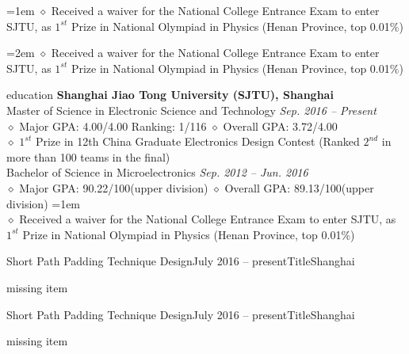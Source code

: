 \documentclass{resume} %
\begin{document}
\hangindent=1em
$\diamond$ Received a waiver for the National College Entrance Exam to enter SJTU, as $1^{st}$ Prize in National Olympiad in Physics (Henan Province, top 0.01$\%$) 
\par
\hangindent=2em
$\diamond$ Received a waiver for the National College Entrance Exam to enter SJTU, as $1^{st}$ Prize in National Olympiad in Physics (Henan Province, top 0.01$\%$)

\begin{rSection}{education}
\textbf{Shanghai Jiao Tong University (SJTU), Shanghai}
\\Master of Science in Electronic Science and Technology \hfill \emph{Sep. 2016 -- Present}
\\$\diamond$ Major GPA: 4.00/4.00 \qquad Ranking: 1/116 \qquad $\diamond$ Overall GPA: 3.72/4.00
\\$\diamond$ $1^{st}$ Prize in 12th China Graduate Electronics Design Contest (Ranked $2^{nd}$ in more than 100 teams in the final)
\\Bachelor of Science in Microelectronics \hfill \emph{Sep. 2012 -- Jun. 2016}
\\$\diamond$ Major GPA: 90.22/100(upper division) \qquad \qquad$\diamond$ Overall GPA: 89.13/100(upper division)
\hangindent=1em
\\$\diamond$ Received a waiver for the National College Entrance Exam to enter SJTU, as $1^{st}$ Prize in National Olympiad in Physics (Henan Province, top 0.01$\%$) \\
\begin{rSubsection}{Short Path Padding Technique Design}{July 2016 -- present}{Title}{Shanghai}
\item missing item
\end{rSubsection}
\begin{rSubsection}{Short Path Padding Technique Design}{July 2016 -- present}{Title}{Shanghai}
\item missing item
\end{rSubsection}
\end{rSection}



\end{document}
